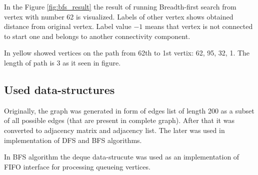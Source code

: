 In the Figure \ref{fig:bfs_result} the result of running Breadth-first search from vertex with number 62 is visualized.
Labels of other vertex shows obtained distance from original vertex. Label value $-1$ means that vertex is not connected to start one and belongs to another connectivity component.

In yellow showed vertices on the path from 62th to 1st vertix: 62, 95, 32, 1. The length of path is 3 as it seen in figure. 

\subsection*{Used data-structures}

Originally, the graph was generated in form of edges list of length 200 as a subset of all possible edges (that are present in complete graph).
After that it was converted to adjacency matrix and adjacency list. The later was used in implementation of DFS and BFS algorithms.

In BFS algorithm the deque data-strucute was used as an implementation of FIFO interface for processing queueing vertices.